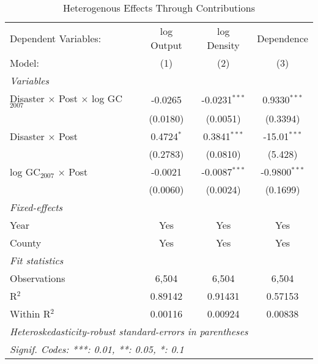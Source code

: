 
\begin{table}[htbp]
   \caption{Heterogenous Effects Through Contributions}
   \centering
   \begin{adjustbox}{max width = \textwidth, center}
      \begin{tabular}{lccc}
         \tabularnewline \midrule \midrule
         Dependent Variables:                              & log Output   & log Density     & Dependence\\  
         Model:                                            & (1)          & (2)             & (3)\\  
         \midrule
         \emph{Variables}\\
         Disaster $\times$ Post $\times$ log GC$_{2007}$   & -0.0265      & -0.0231$^{***}$ & 0.9330$^{***}$\\   
                                                           & (0.0180)     & (0.0051)        & (0.3394)\\   
         Disaster $\times$ Post                            & 0.4724$^{*}$ & 0.3841$^{***}$  & -15.01$^{***}$\\   
                                                           & (0.2783)     & (0.0810)        & (5.428)\\   
         log GC$_{2007}$ $\times$ Post                     & -0.0021      & -0.0087$^{***}$ & -0.9800$^{***}$\\   
                                                           & (0.0060)     & (0.0024)        & (0.1699)\\   
         \midrule
         \emph{Fixed-effects}\\
         Year                                              & Yes          & Yes             & Yes\\  
         County                                            & Yes          & Yes             & Yes\\  
         \midrule
         \emph{Fit statistics}\\
         Observations                                      & 6,504        & 6,504           & 6,504\\  
         R$^2$                                             & 0.89142      & 0.91431         & 0.57153\\  
         Within R$^2$                                      & 0.00116      & 0.00924         & 0.00838\\  
         \midrule \midrule
         \multicolumn{4}{l}{\emph{Heteroskedasticity-robust standard-errors in parentheses}}\\
         \multicolumn{4}{l}{\emph{Signif. Codes: ***: 0.01, **: 0.05, *: 0.1}}\\
      \end{tabular}
   \end{adjustbox}
\end{table}


